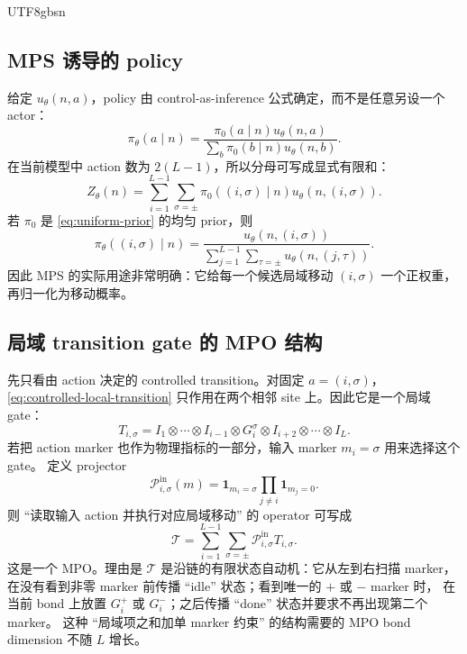 \documentclass[11pt]{article}
\begin{document}
\begin{CJK*}{UTF8}{gbsn}
\subsection{MPS 诱导的 policy}

给定 \(u_\theta(n,a)\)，policy 由 control-as-inference 公式确定，而不是任意另设一个 actor：
\begin{equation}
    \pi_\theta(a\mid n)
    =
    \frac{\pi_0(a\mid n)u_\theta(n,a)}
    {\sum_b\pi_0(b\mid n)u_\theta(n,b)}.
    \label{eq:tn-policy}
\end{equation}
在当前模型中 action 数为 \(2(L-1)\)，所以分母可写成显式有限和：
\begin{equation}
    Z_\theta(n)
    =
    \sum_{i=1}^{L-1}
    \sum_{\sigma=\pm}
    \pi_0((i,\sigma)\mid n)
    u_\theta(n,(i,\sigma)).
    \label{eq:policy-normalizer}
\end{equation}
若 \(\pi_0\) 是 \eqref{eq:uniform-prior} 的均匀 prior，则
\begin{equation}
    \pi_\theta((i,\sigma)\mid n)
    =
    \frac{u_\theta(n,(i,\sigma))}
    {\sum_{j=1}^{L-1}\sum_{\tau=\pm}u_\theta(n,(j,\tau))}.
\end{equation}
因此 MPS 的实际用途非常明确：它给每一个候选局域移动 \((i,\sigma)\) 一个正权重，
再归一化为移动概率。

\subsection{局域 transition gate 的 MPO 结构}

先只看由 action 决定的 controlled transition。对固定 \(a=(i,\sigma)\)，
\eqref{eq:controlled-local-transition} 只作用在两个相邻 site 上。因此它是一个局域 gate：
\begin{equation}
    T_{i,\sigma}
    =
    I_1\otimes\cdots\otimes I_{i-1}
    \otimes G_i^\sigma
    \otimes I_{i+2}\otimes\cdots\otimes I_L.
    \label{eq:local-transition-gate}
\end{equation}
若把 action marker 也作为物理指标的一部分，输入 marker \(m_i=\sigma\) 用来选择这个 gate。
定义 projector
\begin{equation}
    \mathcal P_{i,\sigma}^{\mathrm{in}}(m)
    =
    \mathbf 1_{m_i=\sigma}
    \prod_{j\neq i}\mathbf 1_{m_j=0}.
\end{equation}
则 ``读取输入 action 并执行对应局域移动'' 的 operator 可写成
\begin{equation}
    \mathcal T
    =
    \sum_{i=1}^{L-1}
    \sum_{\sigma=\pm}
    \mathcal P_{i,\sigma}^{\mathrm{in}}
    T_{i,\sigma}.
    \label{eq:controlled-transition-operator}
\end{equation}
这是一个 MPO。理由是 \(\mathcal T\) 是沿链的有限状态自动机：它从左到右扫描 marker，
在没有看到非零 marker 前传播 ``idle'' 状态；看到唯一的 \(+\) 或 \(-\) marker 时，
在当前 bond 上放置 \(G_i^+\) 或 \(G_i^-\)；之后传播 ``done'' 状态并要求不再出现第二个 marker。
这种 ``局域项之和加单 marker 约束'' 的结构需要的 MPO bond dimension 不随 \(L\) 增长。


\end{CJK*}
\end{document}
